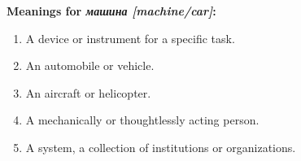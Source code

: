 \documentclass[a0,portrait]{a0poster}
\begin{document}
\begin{multicols}{2}
\begin{center}
    \begin{minipage}{0.4\textwidth}
        \centering
        \textbf{Meanings for \textit{машина [machine/car]}:}\\
        \begin{enumerate}[leftmargin=7cm]
            \item A device or instrument for a specific task.
            \item An automobile or vehicle.
            \item An aircraft or helicopter.
            \item A mechanically or thoughtlessly acting person.
            \item A system, a collection of institutions or organizations.
        \end{enumerate}
    \end{minipage}
\end{center}


%
%
%
%
%
%


\end{multicols}
\end{document}
